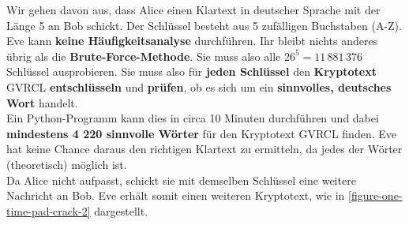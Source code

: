 Wir gehen davon aus, dass Alice einen Klartext in deutscher Sprache mit der Länge \num{5} an Bob schickt. Der Schlüssel besteht aus \num{5} zufälligen Buchstaben (A-Z). Eve kann \textbf{keine Häufigkeitsanalyse} durchführen. Ihr bleibt nichts anderes übrig als die \textbf{Brute-Force-Methode}. Sie muss also alle $26^5 = 11\,881\,376$ Schlüssel ausprobieren. Sie muss also für \textbf{jeden Schlüssel} den \textbf{Kryptotext} GVRCL \textbf{entschlüsseln} und \textbf{prüfen}, ob es sich um ein \textbf{sinnvolles, deutsches Wort} handelt.\\
Ein Python-Programm kann dies in circa \num{10} Minuten durchführen und dabei \textbf{mindestens 4 220 sinnvolle Wörter} für den Kryptotext GVRCL finden. Eve hat keine Chance daraus den richtigen Klartext zu ermitteln, da jedes der Wörter (theoretisch) möglich ist. \\

Da Alice nicht aufpasst, schickt sie mit demselben Schlüssel eine weitere Nachricht an Bob. Eve erhält somit einen weiteren Kryptotext, wie in \autoref{figure-one-time-pad-crack-2} dargestellt.

